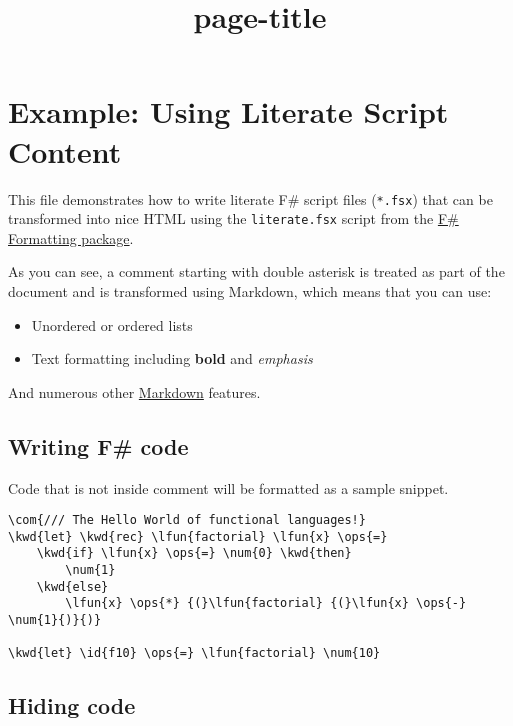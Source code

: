 \documentclass{article}
\title{{page-title}}
\date{}
\newcommand{\id}[1]{\textcolor{black}{#1}}
\newcommand{\com}[1]{\textcolor{officegreen}{#1}}
\newcommand{\kwd}[1]{\textcolor{navy}{#1}}
\newcommand{\num}[1]{\textcolor{officegreen}{#1}}
\newcommand{\ops}[1]{\textcolor{purple}{#1}}
\begin{document}
\maketitle


\section*{Example: Using Literate Script Content}



This file demonstrates how to write literate F\# script
files (\texttt{*.fsx}) that can be transformed into nice HTML
using the \texttt{literate.fsx} script from the \href{http://fsprojects.github.io/FSharp.Formatting}{F\# Formatting
package}.


As you can see, a comment starting with double asterisk
is treated as part of the document and is transformed
using Markdown, which means that you can use:
\begin{itemize}
\item Unordered or ordered lists

\item Text formatting including \textbf{bold} and \emph{emphasis}

\end{itemize}



And numerous other \href{http://daringfireball.net/projects/markdown}{Markdown} features.
\subsection*{Writing F\# code}



Code that is not inside comment will be formatted as
a sample snippet.
\begin{Verbatim}[commandchars=\\\{\}]
\com{/// The Hello World of functional languages!}
\kwd{let} \kwd{rec} \lfun{factorial} \lfun{x} \ops{=}
    \kwd{if} \lfun{x} \ops{=} \num{0} \kwd{then}
        \num{1}
    \kwd{else}
        \lfun{x} \ops{*} {(}\lfun{factorial} {(}\lfun{x} \ops{-} \num{1}{)}{)}

\kwd{let} \id{f10} \ops{=} \lfun{factorial} \num{10}
\end{Verbatim}

\subsection*{Hiding code}
\end{document}
